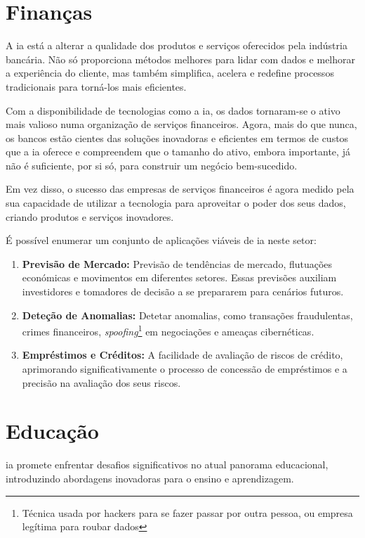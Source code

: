 \documentclass[a4paper, 11pt, onecolumn, oneside]{report}
\begin{document}
\section{Finanças}
A \ac{ia} está a alterar a qualidade dos produtos e serviços oferecidos pela indústria bancária. Não só proporciona métodos melhores para lidar com dados e melhorar a experiência do cliente, mas também simplifica, acelera e redefine processos tradicionais para torná-los mais eficientes.
\par
Com a disponibilidade de tecnologias como a \ac{ia}, os dados tornaram-se o ativo mais valioso numa organização de serviços financeiros. Agora, mais do que nunca, os bancos estão cientes das soluções inovadoras e eficientes em termos de custos que a \ac{ia} oferece e compreendem que o tamanho do ativo, embora importante, já não é suficiente, por si só, para construir um negócio bem-sucedido.
\par
Em vez disso, o sucesso das empresas de serviços financeiros é agora medido pela sua capacidade de utilizar a tecnologia para aproveitar o poder dos seus dados, criando produtos e serviços inovadores.
\par
É possível enumerar um conjunto de aplicações viáveis de \ac{ia} neste setor:

\begin{enumerate}
    \item \textbf{Previsão de Mercado:} Previsão de tendências de mercado, flutuações económicas e movimentos em diferentes setores. Essas previsões auxiliam investidores e tomadores de decisão a se prepararem para cenários futuros.
    \item \textbf{Deteção de Anomalias:} Detetar anomalias, como transações fraudulentas, crimes financeiros, \textit{spoofing}\footnote{Técnica usada por hackers para se fazer passar por outra pessoa, ou empresa legítima para roubar dados} em negociações e ameaças cibernéticas.
    \item \textbf{Empréstimos e Créditos:} A facilidade de avaliação de riscos de crédito, aprimorando significativamente o processo de concessão de empréstimos e a precisão na avaliação dos seus riscos. 
\end{enumerate}

\section{Educação}
\ac{ia} promete enfrentar desafios significativos no atual panorama educacional, introduzindo abordagens inovadoras para o ensino e aprendizagem.
\end{document}
